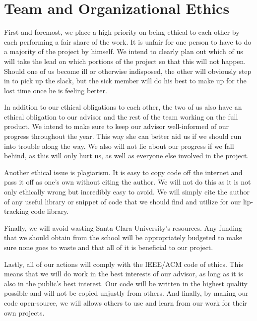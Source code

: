 \section{Team and Organizational Ethics}
First and foremost, we place a high priority on being ethical to each other by each performing a fair share of the work. It is unfair for one person to have to do a majority of the project by himself. We intend to clearly plan out which of us will take the lead on which portions of the project so that this will not happen. Should one of us become ill or otherwise indisposed, the other will obviously step in to pick up the slack, but the sick member will do his best to make up for the lost time once he is feeling better.

In addition to our ethical obligations to each other, the two of us also have an ethical obligation to our advisor and the rest of the team working on the full product. We intend to make sure to keep our advisor well-informed of our progress throughout the year. This way she can better aid us if we should run into trouble along the way. We also will not lie about our progress if we fall behind, as this will only hurt us, as well as everyone else involved in the project.

Another ethical issue is plagiarism. It is easy to copy code off the internet and pass it off as one's own without citing the author. We will not do this as it is not only ethically wrong but incredibly easy to avoid. We will simply cite the author of any useful library or snippet of code that we should find and utilize for our lip-tracking code library.

Finally, we will avoid wasting Santa Clara University's resources. Any funding that we should obtain from the school will be appropriately budgeted to make sure none goes to waste and that all of it is beneficial to our project.

Lastly, all of our actions will comply with the IEEE/ACM code of ethics. This means that we will do work in the best interests of our advisor, as long as it is also in the public's best interest. Our code will be written in the highest quality possible and will not be copied unjustly from others. And finally, by making our code open-source, we will allows others to use and learn from our work for their own projects. 


